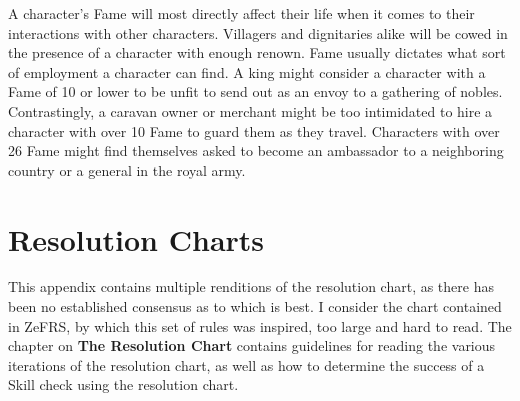 \documentclass[oneside]{book}
\begin{document}
\begin{multicols}{2}
A character's Fame will most directly affect their life when it comes to their interactions with other characters. Villagers and dignitaries alike will be cowed in the presence of a character with enough renown. Fame usually dictates what sort of employment a character can find. A king might consider a character with a Fame of 10 or lower to be unfit to send out as an envoy to a gathering of nobles. Contrastingly, a caravan owner or merchant might be too intimidated to hire a character with over 10 Fame to guard them as they travel. Characters with over 26 Fame might find themselves asked to become an ambassador to a neighboring country or a general in the royal army.

\end{multicols}

\appendix
\chapter{Resolution Charts}
This appendix contains multiple renditions of the resolution chart, as there has been no established consensus as to which is best. I consider the chart contained in ZeFRS, by which this set of rules was inspired, too large and hard to read. The chapter on \textbf{The Resolution Chart} contains guidelines for reading the various iterations of the resolution chart, as well as how to determine the success of a Skill check using the resolution chart. 
\end{document}
